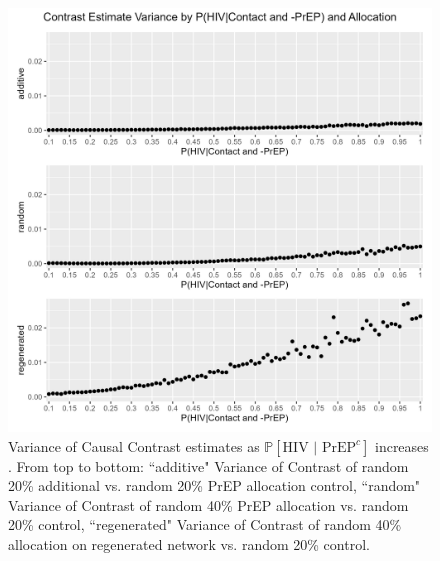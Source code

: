 \documentclass{article}
\theoremstyle{definition}
\begin{document}
\begin{figure}[H]
    \centering
    \includegraphics[scale=0.75]{Figures/p1 Variance plots.png}
    \caption{Variance of Causal Contrast estimates as $\mathbb{P}\left[\text{HIV } \vert \text{ PrEP}^{c}\right]$ increases .  From top to bottom: ``additive" Variance of Contrast of random 20\% additional vs. random 20\% PrEP allocation control, ``random" Variance of Contrast of random 40\% PrEP allocation vs. random 20\% control, ``regenerated" Variance of Contrast of random 40\% allocation on regenerated network vs. random 20\% control.}
    \label{fig:Figure 14}
\end{figure}
\end{document}
